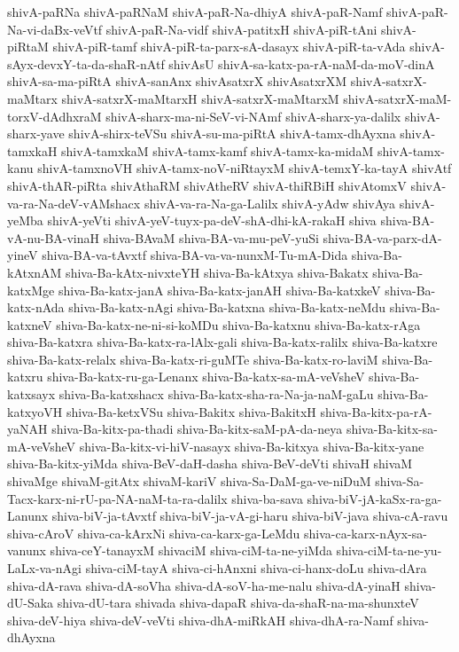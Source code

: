 {shivA-paRNa
shivA-paRNaM
shivA-paR-Na-dhiyA
shivA-paR-Namf
shivA-paR-Na-vi-daBx-veVtf
shivA-paR-Na-vidf
shivA-patitxH
shivA-piR-tAni
shivA-piRtaM
shivA-piR-tamf
shivA-piR-ta-parx-sA-dasayx
shivA-piR-ta-vAda
shivA-sAyx-devxY-ta-da-shaR-nAtf
shivAsU
shivA-sa-katx-pa-rA-naM-da-moV-dinA
shivA-sa-ma-piRtA
shivA-sanAnx
shivAsatxrX
shivAsatxrXM
shivA-satxrX-maMtarx
shivA-satxrX-maMtarxH
shivA-satxrX-maMtarxM
shivA-satxrX-maM-torxV-dAdhxraM
shivA-sharx-ma-ni-SeV-vi-NAmf
shivA-sharx-ya-dalilx
shivA-sharx-yave
shivA-shirx-teVSu
shivA-su-ma-piRtA
shivA-tamx-dhAyxna
shivA-tamxkaH
shivA-tamxkaM
shivA-tamx-kamf
shivA-tamx-ka-midaM
shivA-tamx-kanu
shivA-tamxnoVH
shivA-tamx-noV-niRtayxM
shivA-temxY-ka-tayA
shivAtf
shivA-thAR-piRta
shivAthaRM
shivAtheRV
shivA-thiRBiH
shivAtomxV
shivA-va-ra-Na-deV-vAMshacx
shivA-va-ra-Na-ga-Lalilx
shivA-yAdw
shivAya
shivA-yeMba
shivA-yeVti
shivA-yeV-tuyx-pa-deV-shA-dhi-kA-rakaH
shiva
shiva-BA-vA-nu-BA-vinaH
shiva-BAvaM
shiva-BA-va-mu-peV-yuSi
shiva-BA-va-parx-dA-yineV
shiva-BA-va-tAvxtf
shiva-BA-va-va-nunxM-Tu-mA-Dida
shiva-Ba-kAtxnAM
shiva-Ba-kAtx-nivxteYH
shiva-Ba-kAtxya
shiva-Bakatx
shiva-Ba-katxMge
shiva-Ba-katx-janA
shiva-Ba-katx-janAH
shiva-Ba-katxkeV
shiva-Ba-katx-nAda
shiva-Ba-katx-nAgi
shiva-Ba-katxna
shiva-Ba-katx-neMdu
shiva-Ba-katxneV
shiva-Ba-katx-ne-ni-si-koMDu
shiva-Ba-katxnu
shiva-Ba-katx-rAga
shiva-Ba-katxra
shiva-Ba-katx-ra-lAlx-gali
shiva-Ba-katx-ralilx
shiva-Ba-katxre
shiva-Ba-katx-relalx
shiva-Ba-katx-ri-guMTe
shiva-Ba-katx-ro-laviM
shiva-Ba-katxru
shiva-Ba-katx-ru-ga-Lenanx
shiva-Ba-katx-sa-mA-veVsheV
shiva-Ba-katxsayx
shiva-Ba-katxshacx
shiva-Ba-katx-sha-ra-Na-ja-naM-gaLu
shiva-Ba-katxyoVH
shiva-Ba-ketxVSu
shiva-Bakitx
shiva-BakitxH
shiva-Ba-kitx-pa-rA-yaNAH
shiva-Ba-kitx-pa-thadi
shiva-Ba-kitx-saM-pA-da-neya
shiva-Ba-kitx-sa-mA-veVsheV
shiva-Ba-kitx-vi-hiV-nasayx
shiva-Ba-kitxya
shiva-Ba-kitx-yane
shiva-Ba-kitx-yiMda
shiva-BeV-daH-dasha
shiva-BeV-deVti
shivaH
shivaM
shivaMge
shivaM-gitAtx
shivaM-kariV
shiva-Sa-DaM-ga-ve-niDuM
shiva-Sa-Tacx-karx-ni-rU-pa-NA-naM-ta-ra-dalilx
shiva-ba-sava
shiva-biV-jA-kaSx-ra-ga-Lanunx
shiva-biV-ja-tAvxtf
shiva-biV-ja-vA-gi-haru
shiva-biV-java
shiva-cA-ravu
shiva-cAroV
shiva-ca-kArxNi
shiva-ca-karx-ga-LeMdu
shiva-ca-karx-nAyx-sa-vanunx
shiva-ceY-tanayxM
shivaciM
shiva-ciM-ta-ne-yiMda
shiva-ciM-ta-ne-yu-LaLx-va-nAgi
shiva-ciM-tayA
shiva-ci-hAnxni
shiva-ci-hanx-doLu
shiva-dAra
shiva-dA-rava
shiva-dA-soVha
shiva-dA-soV-ha-me-nalu
shiva-dA-yinaH
shiva-dU-Saka
shiva-dU-tara
shivada
shiva-dapaR
shiva-da-shaR-na-ma-shunxteV
shiva-deV-hiya
shiva-deV-veVti
shiva-dhA-miRkAH
shiva-dhA-ra-Namf
shiva-dhAyxna
}

